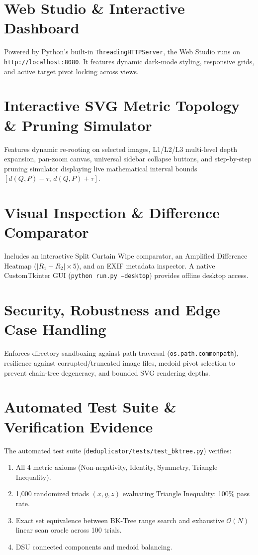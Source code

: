 \documentclass[11pt,a4paper]{article}
\begin{document}
\section{Web Studio \& Interactive Dashboard}
Powered by Python's built-in \texttt{ThreadingHTTPServer}, the Web Studio runs on \texttt{http://localhost:8080}. It features dynamic dark-mode styling, responsive grids, and active target pivot locking across views.

\section{Interactive SVG Metric Topology \& Pruning Simulator}
Features dynamic re-rooting on selected images, L1/L2/L3 multi-level depth expansion, pan-zoom canvas, universal sidebar collapse buttons, and step-by-step pruning simulator displaying live mathematical interval bounds $[d(Q, P) - \tau, \, d(Q, P) + \tau]$.

\section{Visual Inspection \& Difference Comparator}
Includes an interactive Split Curtain Wipe comparator, an Amplified Difference Heatmap ($|R_1 - R_2| \times 5$), and an EXIF metadata inspector. A native CustomTkinter GUI (\texttt{python run.py --desktop}) provides offline desktop access.

\section{Security, Robustness and Edge Case Handling}
Enforces directory sandboxing against path traversal (\texttt{os.path.commonpath}), resilience against corrupted/truncated image files, medoid pivot selection to prevent chain-tree degeneracy, and bounded SVG rendering depths.

\section{Automated Test Suite \& Verification Evidence}
The automated test suite (\texttt{deduplicator/tests/test\_bktree.py}) verifies:
\begin{enumerate}
    \item All 4 metric axioms (Non-negativity, Identity, Symmetry, Triangle Inequality).
    \item 1,000 randomized triads $(x, y, z)$ evaluating Triangle Inequality: 100\% pass rate.
    \item Exact set equivalence between BK-Tree range search and exhaustive $\mathcal{O}(N)$ linear scan oracle across 100 trials.
    \item DSU connected components and medoid balancing.
\end{enumerate}
\end{document}
